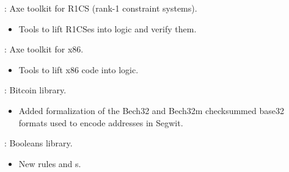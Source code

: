 
\begin{frame}

\implibtitle

:
Axe toolkit for R1CS (rank-1 constraint systems).
\begin{itemize}
\item Tools to lift R1CSes into logic and verify them.
\end{itemize}

\end{frame}


\begin{frame}

\implibtitle

:
Axe toolkit for x86.
\begin{itemize}
\item Tools to lift x86 code into logic.
\end{itemize}

\end{frame}


\begin{frame}

\implibtitle

:
Bitcoin library.
\begin{itemize}
\item Added formalization of the Bech32 and Bech32m checksummed base32 formats
      used to encode addresses in Segwit.
\end{itemize}

\end{frame}


\begin{frame}

\implibtitle

:
Booleans library.
\begin{itemize}
\item New rules and s.
\end{itemize}

\end{frame}


